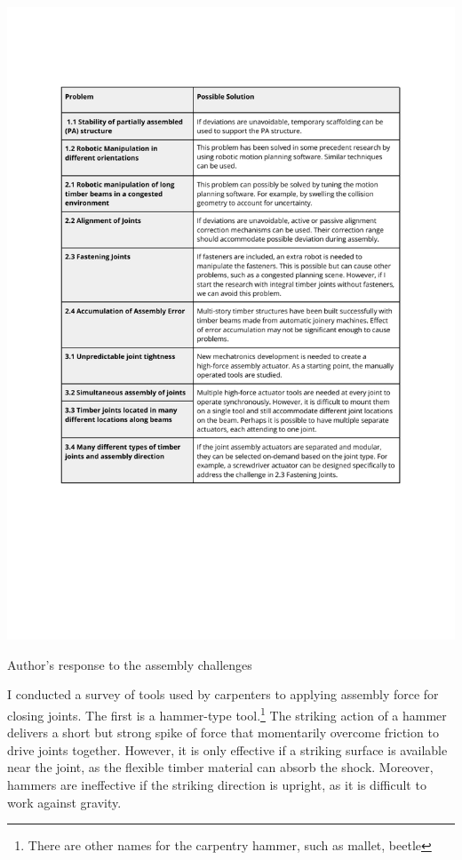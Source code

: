 \begin{table}[p]
    \includegraphics[page=1, trim=25.4mm 60mm 25.4mm 33mm, clip, width=\textwidth]{tables/Tables in Chapter 4.pdf}
    \caption{Author's response to the assembly challenges}
    \label{table:response-to-challenges}
\end{table}

I conducted a survey of tools used by carpenters to applying assembly force for closing joints. The first is a hammer-type tool.\footnote{There are other names for the carpentry hammer, such as mallet, beetle} The striking action of a hammer delivers a short but strong spike of force that momentarily overcome friction to drive joints together. However, it is only effective if a striking surface is available near the joint, as the flexible timber material can absorb the shock. Moreover, hammers are ineffective if the striking direction is upright, as it is difficult to work against gravity. 

